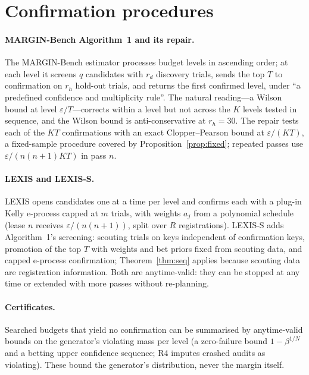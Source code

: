 \documentclass[11pt]{article}
\theoremstyle{definition}
\begin{document}
\section{Confirmation procedures}\label{sec:procedures}

\paragraph{MARGIN-Bench Algorithm~1 and its repair.} The MARGIN-Bench estimator processes budget levels in ascending order; at each level it screens $q$ candidates with $r_d$ discovery trials, sends the top $T$ to confirmation on $r_h$ hold-out trials, and returns the first confirmed level, under ``a predefined confidence and multiplicity rule''. The natural reading---a Wilson bound at level $\varepsilon/T$---corrects within a level but not across the $K$ levels tested in sequence, and the Wilson bound is anti-conservative at $r_h=30$. The repair tests each of the $KT$ confirmations with an exact Clopper--Pearson bound at $\varepsilon/(KT)$, a fixed-sample procedure covered by Proposition~\ref{prop:fixed}; repeated passes use $\varepsilon/(n(n+1)KT)$ in pass $n$.

\paragraph{LEXIS and LEXIS-S.} LEXIS opens candidates one at a time per level and confirms each with a plug-in Kelly e-process capped at $m$ trials, with weights $a_j$ from a polynomial schedule (lease $n$ receives $\varepsilon/(n(n+1))$, split over $R$ registrations). LEXIS-S adds Algorithm~1's screening: scouting trials on keys independent of confirmation keys, promotion of the top $T$ with weights and bet priors fixed from scouting data, and capped e-process confirmation; Theorem~\ref{thm:seq} applies because scouting data are registration information. Both are anytime-valid: they can be stopped at any time or extended with more passes without re-planning.

\paragraph{Certificates.} Searched budgets that yield no confirmation can be summarised by anytime-valid bounds on the generator's violating mass per level (a zero-failure bound $1-\beta^{1/N}$ and a betting upper confidence sequence; R4 imputes crashed audits as violating). These bound the generator's distribution, never the margin itself.
\end{document}
